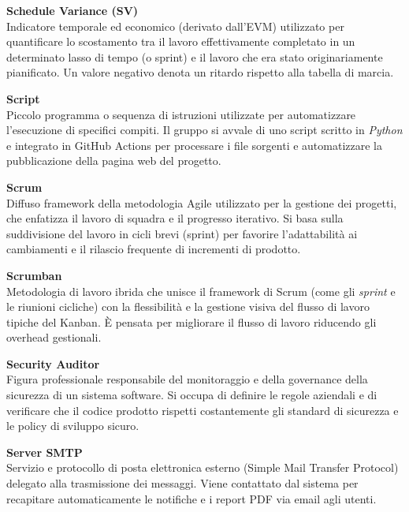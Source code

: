 \documentclass[12pt, a4paper]{article}
\begin{document}
\noindent\hypertarget{schedule-variance}{\textbf{Schedule Variance (SV)}} \\[0.1em]
Indicatore temporale ed economico (derivato dall'EVM) utilizzato per quantificare lo scostamento tra il lavoro effettivamente completato in un determinato lasso di tempo (o sprint) e il lavoro che era stato originariamente pianificato. Un valore negativo denota un ritardo rispetto alla tabella di marcia.
\vspace{0.5cm}

\noindent\hypertarget{script}{\textbf{Script}} \\[0.1em]
Piccolo programma o sequenza di istruzioni utilizzate per automatizzare l'esecuzione di specifici compiti. Il gruppo si avvale di uno script scritto in \textit{Python} e integrato in GitHub Actions per processare i file sorgenti e automatizzare la pubblicazione della pagina web del progetto.
\vspace{0.5cm}  

\noindent\hypertarget{scrum}{\textbf{Scrum}} \\[0.1em]
Diffuso framework della metodologia Agile utilizzato per la gestione dei progetti, che enfatizza il lavoro di squadra e il progresso iterativo. Si basa sulla suddivisione del lavoro in cicli brevi (sprint) per favorire l'adattabilità ai cambiamenti e il rilascio frequente di incrementi di prodotto.
\vspace{0.5cm}

\noindent\hypertarget{scrumban}{\textbf{Scrumban}} \\[0.1em]
Metodologia di lavoro ibrida che unisce il framework di Scrum (come gli \textit{sprint} e le riunioni cicliche) con la flessibilità e la gestione visiva del flusso di lavoro tipiche del Kanban. È pensata per migliorare il flusso di lavoro riducendo gli overhead gestionali.
\vspace{0.5cm}

\noindent\hypertarget{security-auditor}{\textbf{Security Auditor}} \\[0.1em]
Figura professionale responsabile del monitoraggio e della governance della sicurezza di un sistema software. Si occupa di definire le regole aziendali e di verificare che il codice prodotto rispetti costantemente gli standard di sicurezza e le policy di sviluppo sicuro.
\vspace{0.5cm}

\noindent\hypertarget{server-smtp}{\textbf{Server SMTP}} \\[0.1em]
Servizio e protocollo di posta elettronica esterno (Simple Mail Transfer Protocol) delegato alla trasmissione dei messaggi. Viene contattato dal sistema per recapitare automaticamente le notifiche e i report PDF via email agli utenti.
\vspace{0.5cm}  
\end{document}
